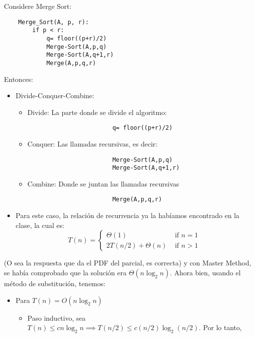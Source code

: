 \begin{problema}
    Considere Merge Sort: 
    \begin{verbatim}
    Merge_Sort(A, p, r):
        if p < r:
            q= floor((p+r)/2)
            Merge-Sort(A,p,q)
            Merge-Sort(A,q+1,r)
            Merge(A,p,q,r)
    \end{verbatim}
    Entonces: 
    \begin{itemize}
        \item Divide-Conquer-Combine: 
        \begin{itemize}
            \item Divide: La parte donde se divide el algoritmo: 
            \begin{verbatim}
                        q= floor((p+r)/2)
                \end{verbatim}
            \item Conquer: Las llamadas recursivas, es decir: 
            \begin{verbatim}
                        Merge-Sort(A,p,q)
                        Merge-Sort(A,q+1,r)
                \end{verbatim}
            \item Combine: Donde se juntan las llamadas recursivas
            \begin{verbatim}
                        Merge(A,p,q,r)
                \end{verbatim}
        \end{itemize}
        \item Para este caso, la relación de recurrencia ya la habíamos encontrado en la clase, la cual es: 
        $$
T(n)= \begin{cases}\Theta(1) & \text { if } n=1 \\ 2 T(n / 2)+\Theta(n) & \text { if } n>1\end{cases}
$$
    \end{itemize}
    (O sea la respuesta que da el PDF del parcial, es correcta) y con Master Method, se había comprobado que la solución era $\Theta(n\log_2 n)$. Ahora bien, usando el método de substitución, tenemos: 
    \begin{itemize}
        \item Para $T(n)=O(n\log_2 n)$
        \begin{itemize}
            \item Paso inductivo, sea $T(n)\leq cn\log_2 n \implies T(n/2)\leq c\left(n/2\right)\log_2 (n/2)$. Por lo tanto, 
            \begin{align*}

\end{align*}
\end{itemize}
\end{itemize}
\end{problema}
